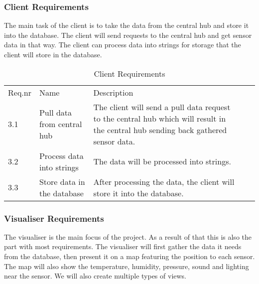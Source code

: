 \documentclass[../document]{subfiles}
\begin{document}
\newpage
\subsubsection{Client Requirements}
The main task of the client is to take the data from the central hub and store it into the database. The client will send requests to the central hub and get sensor data in that way. The client can process data into strings for storage that the client will store in the database.

\begin{table}[H]
\caption{Client Requirements}
\centering
\begin{tabularx}{\textwidth}{|l|X|X|l|X|}
\hline
\\ \hline Req.nr
&Name
&Description
\\ \hline3.1
&Pull data from central hub
&The client will send a pull data request to the central hub which will result in the central hub sending back gathered sensor data.
\\ \hline3.2
&Process data into strings
&The data will be processed into strings.
\\ \hline3.3
&Store data in the database
&After processing the data, the client will store it into the database.
\\ \hline 
\end{tabularx}
\end{table}

\newpage
\subsubsection{Visualiser Requirements}
The visualiser is the main focus of the project. As a result of that this is also the part with most requirements. The visualiser will first gather the data it needs from the database, then present it on a map featuring the position to each sensor. The map will also show the temperature, humidity, pressure, sound and lighting near the sensor. We will also create multiple types of views.
\end{document}
